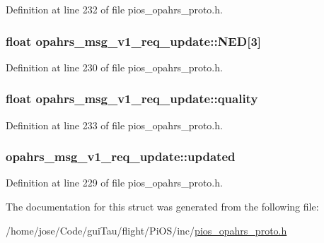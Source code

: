 Definition at line 232 of file pios\-\_\-opahrs\-\_\-proto.\-h.

\hypertarget{structopahrs__msg__v1__req__update_aad52a264ec55e4337d5b1910f48cca03}{
\subsubsection[{N\-E\-D}]{\setlength{\rightskip}{0pt plus 5cm}float opahrs\-\_\-msg\-\_\-v1\-\_\-req\-\_\-update\-::\-N\-E\-D\mbox{[}3\mbox{]}}}\label{structopahrs__msg__v1__req__update_aad52a264ec55e4337d5b1910f48cca03}


Definition at line 230 of file pios\-\_\-opahrs\-\_\-proto.\-h.

\hypertarget{structopahrs__msg__v1__req__update_a5605f0597d2a4b529d0c442d271c0c59}{
\subsubsection[{quality}]{\setlength{\rightskip}{0pt plus 5cm}float opahrs\-\_\-msg\-\_\-v1\-\_\-req\-\_\-update\-::quality}}\label{structopahrs__msg__v1__req__update_a5605f0597d2a4b529d0c442d271c0c59}


Definition at line 233 of file pios\-\_\-opahrs\-\_\-proto.\-h.

\hypertarget{structopahrs__msg__v1__req__update_a5b12c6e7691246a958b43e1e3a09d60c}{
\subsubsection[{updated}]{ opahrs\-\_\-msg\-\_\-v1\-\_\-req\-\_\-update\-::updated}}\label{structopahrs__msg__v1__req__update_a5b12c6e7691246a958b43e1e3a09d60c}


Definition at line 229 of file pios\-\_\-opahrs\-\_\-proto.\-h.



The documentation for this struct was generated from the following file\-:\begin{DoxyCompactItemize}
\item 
/home/jose/\-Code/gui\-Tau/flight/\-Pi\-O\-S/inc/\hyperlink{pios__opahrs__proto_8h}{pios\-\_\-opahrs\-\_\-proto.\-h}\end{DoxyCompactItemize}
